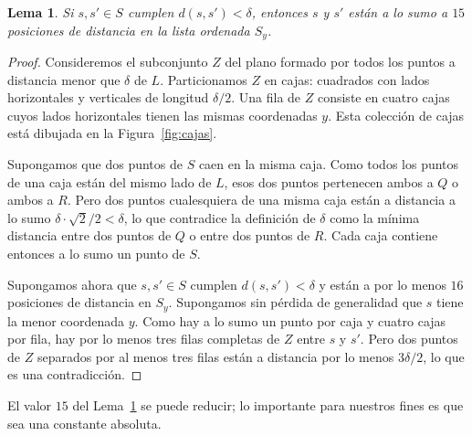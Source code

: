 \documentclass[12pt, spanish, oneside, openany]{book}
\theoremstyle{uprightplain}
\newtheorem{lema}[teorema]{Lema}
\theoremstyle{definition}
\theoremstyle{remark}
\theoremstyle{definition}
\begin{document}
\begin{lema}
\label{lema:quince}
Si $s,s'\in S$ cumplen $d(s,s')<\delta$, entonces $s$ y $s'$ están a lo sumo a $15$ posiciones de distancia en la lista ordenada $S_y$.
\end{lema}
\begin{proof}
Consideremos el subconjunto $Z$ del plano formado por todos los puntos a distancia menor que $\delta$ de $L$. Particionamos $Z$ en cajas: cuadrados con lados horizontales y verticales de longitud $\delta/2$. Una fila de $Z$ consiste en cuatro cajas cuyos lados horizontales tienen las mismas coordenadas $y$. Esta colección de cajas está dibujada en la Figura~\ref{fig:cajas}.

Supongamos que dos puntos de $S$ caen en la misma caja. Como todos los puntos de una caja están del mismo lado de $L$, esos dos puntos pertenecen ambos a $Q$ o ambos a $R$. Pero dos puntos cualesquiera de una misma caja están a distancia a lo sumo $\delta\cdot\sqrt{2}/2<\delta$, lo que contradice la definición de $\delta$ como la mínima distancia entre dos puntos de $Q$ o entre dos puntos de $R$. Cada caja contiene entonces a lo sumo un punto de $S$.

Supongamos ahora que $s,s'\in S$ cumplen $d(s,s')<\delta$ y están a por lo menos $16$ posiciones de distancia en $S_y$. Supongamos sin pérdida de generalidad que $s$ tiene la menor coordenada $y$. Como hay a lo sumo un punto por caja y cuatro cajas por fila, hay por lo menos tres filas completas de $Z$ entre $s$ y $s'$. Pero dos puntos de $Z$ separados por al menos tres filas están a distancia por lo menos $3\delta/2$, lo que es una contradicción.
\end{proof}

El valor $15$ del Lema~\ref{lema:quince} se puede reducir; lo importante para nuestros fines es que sea una constante absoluta.
\end{document}
